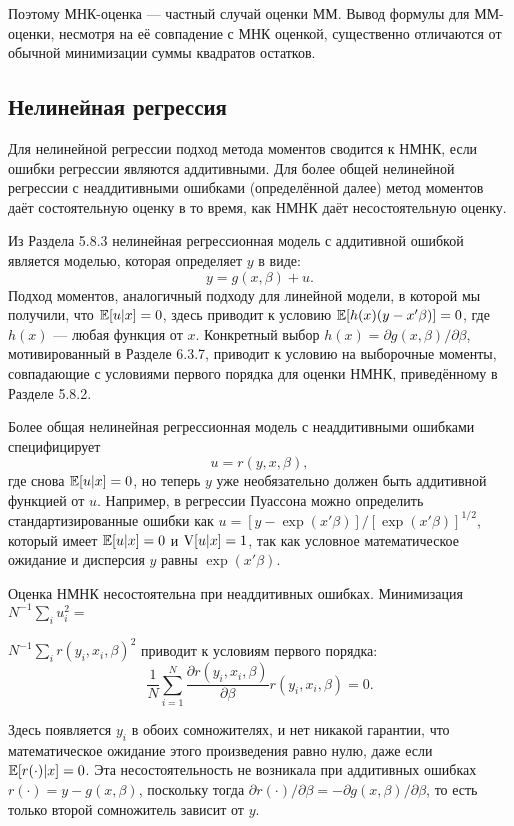 Поэтому МНК-оценка --- частный случай оценки ММ. Вывод формулы для ММ-оценки, несмотря на её совпадение с МНК оценкой, существенно отличаются от обычной минимизации суммы квадратов остатков.

\subsection{Нелинейная регрессия}

Для нелинейной регрессии подход метода моментов сводится к НМНК, если ошибки регрессии являются аддитивными. Для более общей нелинейной регрессии с неаддитивными ошибками (определённой далее) метод моментов даёт состоятельную оценку в то время, как НМНК даёт несостоятельную оценку.

Из Раздела 5.8.3 нелинейная регрессионная модель с аддитивной ошибкой является моделью, которая определяет $y$ в виде:
\[
y=g(x,\beta)+u.
\]
Подход моментов, аналогичный подходу для линейной модели, в которой мы получили, что $\mathbb{E}[u|x]=0$, здесь приводит к условию $\mathbb{E}[h(x)(y-x'\beta)]=0$, где $h(x)$ --- любая функция от $x$. Конкретный выбор $h(x)=\partial g(x,\beta)/ \partial \beta$, мотивированный в Разделе 6.3.7, приводит к условию на выборочные моменты, совпадающие с условиями первого порядка для оценки НМНК, приведённому в Разделе 5.8.2.

Более общая нелинейная регрессионная модель с неаддитивными ошибками специфицирует
\[
u=r(y,x,\beta),
\]
где снова $\mathbb{E}[u|x]=0$, но теперь $y$ уже необязательно должен быть аддитивной функцией от $u$. Например, в регрессии Пуассона можно определить стандартизированные ошибки как $u=[y-\exp(x'\beta)]/[\exp(x'\beta)]^{1/2}$, который имеет $\mathbb{E}[u|x]=0$ и $\mathrm{V}[u|x]=1$, так как условное математическое ожидание и дисперсия $y$ равны $\exp(x'\beta)$.

Оценка НМНК несостоятельна при неаддитивных ошибках. Минимизация $N^{-1} \sum_i u^2_i=$

$N^{-1} \sum_i r(y_i,x_i,\beta)^2$ приводит к условиям первого порядка:
\[
\frac{1}{N} \sum_{i=1}^{N} \frac{\partial r(y_i,x_i,\beta)}{\partial \beta} r(y_i,x_i,\beta)=0.
\]

Здесь появляется $y_i$ в обоих сомножителях, и нет никакой гарантии, что математическое ожидание этого произведения равно нулю, даже если $\mathbb{E}[r(\cdot)|x]=0$. Эта несостоятельность не возникала при аддитивных ошибках $r(\cdot)=y-g(x,\beta)$, поскольку тогда $\partial r(\cdot) / \partial \beta=-\partial g(x,\beta) / \partial \beta$, то есть только второй сомножитель зависит от $y$.

